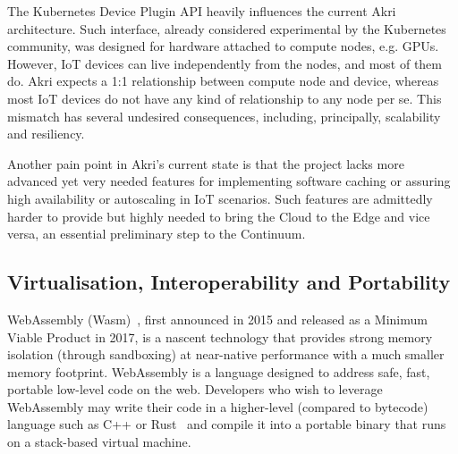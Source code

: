 The Kubernetes Device Plugin API heavily influences the current Akri architecture. Such interface, already considered experimental by the Kubernetes community, was designed for hardware attached to compute nodes, e.g. GPUs. However, IoT devices can live independently from the nodes, and most of them do. Akri expects a 1:1 relationship between compute node and device, whereas most IoT devices do not have any kind of relationship to any node per se. This mismatch has several undesired consequences, including, principally, scalability and resiliency.

Another pain point in Akri's current state is that the project lacks more advanced yet very needed features for implementing software caching or assuring high availability or autoscaling in IoT scenarios. Such features are admittedly harder to provide but highly needed to bring the Cloud to the Edge and vice versa, an essential preliminary step to the Continuum.

\subsection{Virtualisation, Interoperability and Portability}\label{sec:virtualization}


WebAssembly (Wasm)~\cite{haas2017bringing}, first announced in 2015 and released as a Minimum Viable Product in 2017, is a nascent technology that provides strong memory isolation (through sandboxing) at near-native performance with a much smaller memory footprint. WebAssembly is a language designed to address safe, fast, portable low-level code on the web. Developers who wish to leverage WebAssembly may write their code in a higher-level (compared to bytecode) language such as C++ or Rust~\cite{aws-rust} and compile it into a portable binary that runs on a stack-based virtual machine.




